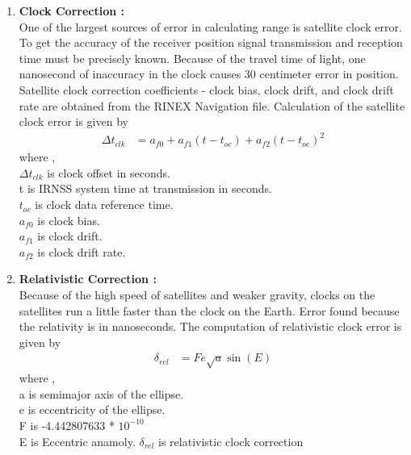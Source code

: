 \documentclass[10pt]{book}
\begin{document}
\begin{enumerate}
  \item \textbf{Clock Correction :} \\
One of the largest sources of error in calculating range is
satellite clock error. To get the accuracy of the receiver
position signal transmission and reception time must be
precisely known. Because of the travel time of light, one
nanosecond of inaccuracy in the clock causes 30 centimeter
error in position. Satellite clock correction coefficients - clock
bias, clock drift, and clock drift rate are obtained from the
RINEX Navigation file. Calculation of the satellite clock error
is given by 
\begin{align}
\Delta t_{clk}&=a_{f0} + a_{f1}(t-t_{oc}) + a_{f2}(t-t_{oc})^2
\end{align}
where ,\\
$\Delta t_{clk}$ is clock offset in seconds.\\
t is IRNSS system time at transmission in seconds.\\
$t_{oc}$ is clock data reference time. \\
$a_{f0}$ is clock bias. \\
$a_{f1}$ is clock drift.\\
$a_{f2}$ is clock drift rate.
\item \textbf{Relativistic Correction :} \\
Because of the high speed of satellites and
weaker gravity, clocks on the satellites run a little faster than the clock on the Earth. Error found because the relativity is in
nanoseconds. The computation of relativistic clock error is given
by
\begin{align}
\delta _{rel}&=Fe\sqrt{a}\sin (E)
\end{align}
where ,\\
a is semimajor axis of the ellipse. \\
e is eccentricity of the ellipse. \\
F is -4.442807633 * $10^{-10}$ \\
E is Eccentric anamoly.
$\delta _{rel}$ is relativistic clock correction \\
\end{enumerate}
\end{document}
